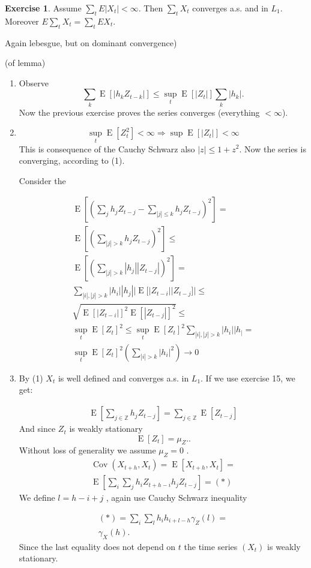 \documentclass[12pt,a4paper, notitlepage]{book}
\theoremstyle{definition} %
\newtheorem{exercise}[definition]{Exercise}
\theoremstyle{plain} %
\newcommand{\Z}{\mathbb Z}
\DeclareMathOperator{\Cov}{Cov}
\DeclareMathOperator{\E}{E}
\begin{document}
\begin{exercise}
Assume $\sum_t E|X_t| < \infty$. Then $\sum_t X_t$ converges a.s. and in $L_1$. Moreover $E\sum_t X_t = \sum_t E X_t$.
\end{exercise}
\begin{hint}
Again lebesgue, but on dominant convergence)
\end{hint}

\proof (of lemma)
\begin{enumerate}
\item Observe 
\[ \sum_k \E[|h_k Z_{t-k}|] \leq \sup_t \E[|Z_t|] \sum_k |h_k|. \]
 Now the previous exercise proves the series converges (everything $< \infty$). 

\item 
\[ \sup_t \E[ Z_t^2 ] < \infty \Rightarrow \sup \E [ | Z_t | ] < \infty \]
This is consequence of the Cauchy Schwarz  also $ |z| \leq 1 + z^2. $ 
Now the series is converging, according to (1). 

Consider the 

\begin{align*} 
\E\left[\left(\sum_j h_j Z_{t-j} - \sum_{|j|\leq k} h_j Z_{t-j}\right)^2 \right] = \\
\E \left[ \left( \sum_{|j| > k} h_j Z_{t-j} \right)^2 \right]  \leq  \\ 
\E\left[ \left(\sum_{|j| > k} |h_j| |Z_{t-j}| \right)^2  \right] = \\
 \sum_{ |i|,|j| > k} |h_i||h_j|  |\E[ |Z_{t-i}||Z_{t-j}  ] |\leq \\
\sqrt{ \E [ | Z_{t-i} |]^2 \E [ | Z_{t-j} | ]^2 }   \leq \\ 
\sup _t \E [ Z_t]^2 \leq 
\sup _t \E [Z_t] ^2 \sum _{|i|, |j|>k} |h_i | |h_| = \\
 \sup _t \E [ Z_t ] ^2 \left( \sum _{|i|>k} |h_i|^2 \right)  \rightarrow 0
\end{align*}
\item
By (1) $ X_t $ is well defined and converges a.s. in $L_1 $. If we use exercise 15, we get:

\begin{align*}
\E \left[ \sum _{j \in \Z} h_j Z_{t-j} \right] = \sum _{j \in \Z} \E[ Z_{t-j} ] \end{align*}
And since $ Z_t $ is weakly stationary 
\[  \E [ Z_t] = \mu _Z . . \]
Without loss of generality we assume $ \mu _Z = 0 $ . 
\begin{align*} \Cov(X_{t+h} , X_t) = \E [ X_{t+h}, X_t ] = \\
\E\left[ \sum_i \sum _j h_i Z_{t+h-i} h_j Z_{t-j} \right] = (*) 
\end{align*}
We define $ l = h-i+j $ , again use Cauchy Schwarz inequality 

\begin{align*}
(*) =  \sum_i \sum_l  h_i h_{i+l-h} \gamma _Z(l) = \\
\gamma _X(h) . \end{align*}
Since the last equality does not depend on $ t $ the time series $ (X_t) $ is weakly stationary.

\end{enumerate}
\endproof
\end{document}
